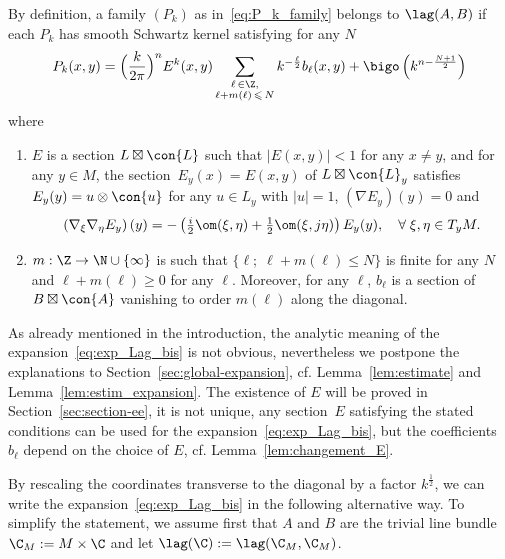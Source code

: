 By definition, a family $(P_k)$ as in~\eqref{eq:P_k_family} belongs to $\lag (A, B)$ if each $P_k$ has smooth Schwartz kernel satisfying for any $N$
\begin{gather}\label{eq:exp_Lag_bis}
P_k (x,y) = \Bigl(\frac{k}{2\pi} \Bigr)^n E^{k}(x,y) \sum_{\substack{\ell\, \in\Z, \\
\ell + m (\ell)\,\leqslant\,N}} k^{-\frac{\ell}{2}} b_{\ell}(x,y) + \bigo \left(k^{n - \frac{N+1}{2}}\right)
\end{gather}
where
\begin{enumerate}
\item $E$ is a section $L \boxtimes \con{L}$ such that $|E (x,y)| < 1$ for any $x\neq y$, and for any $y \in M$, the section~$E_y (x) = E(x,y)$ of $L
\boxtimes \con{L}_y$ satisfies $E_y (y) = u
\otimes \con{u}$ for any $u \in L_y$ with $|u|=1$, $(\nabla E_y)(y) =0$ and
\[
\left(\nabla_\xi \nabla_\eta E_y\right) (y) = -\left(\tfrac{i}{2} \om (\xi, \eta) +
\tfrac{1}{2} \om (\xi, j \eta)\right) E_y (y), \quad \forall \; \xi,\eta
\in T_yM.
\]
\item $m : \Z \rightarrow \N \cup \{ \infty \}$ is such that $\{ \ell; \; \ell + m (\ell) \leqslant N \}$ is finite for any $N$ and $\ell + m (\ell)
\geqslant 0$ for any $\ell$. Moreover, for any $\ell$, $b_{\ell} $ is a section of $B \boxtimes \con{A}$ vanishing to order $m(\ell)$ along the diagonal.
\end{enumerate}
As already mentioned in the introduction, the analytic meaning of the expansion~\eqref{eq:exp_Lag_bis} is not obvious, nevertheless we postpone the explanations to Section~\ref{sec:global-expansion}, cf. Lemma~\ref{lem:estimate} and Lemma~\ref{lem:estim_expansion}. The existence of $E$ will be proved in Section~\ref{sec:section-ee}, it is not unique,   any section~$E$ satisfying the stated conditions can be used for the expansion~\eqref{eq:exp_Lag_bis}, but the coefficients $b_{\ell}$ depend on the choice of $E$, cf. Lemma~\ref{lem:changement_E}.  

By rescaling the coordinates transverse to the diagonal by a factor $k^{\frac{1}{2}}$, we can write the expansion~\eqref{eq:exp_Lag_bis} in the following alternative way. To simplify the statement, we assume first that $A$ and $B$ are the trivial line bundle $\C_M := M \times \C$ and let $\lag (
\C) := \lag (\C_M, \C_M)$.

